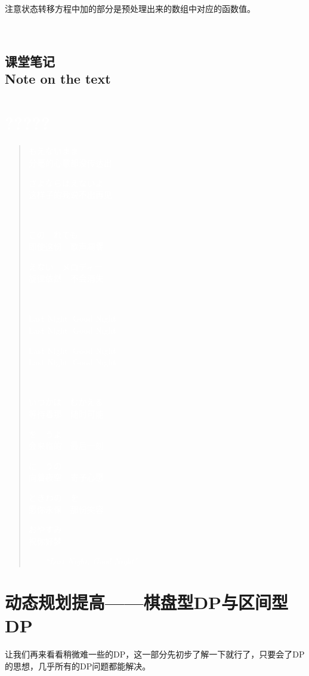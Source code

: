 \documentclass{article}
\theoremstyle{nonumberplain}
\newcommand{\note}{\ \par


	\subsection*{课堂笔记\\\tiny{Note on the text}}
	\newpage}
\begin{document}
注意状态转移方程中加的部分是预处理出来的数组中对应的函数值。

\note
\section*{\textcolor{white}{?????}}
\begin{quote}
	\textcolor{white}{もえないまま\\
		分毫的心意都没传达出}

	\textcolor{white}{さよならはえないよ\\
		这样子的我说不出再见}

	\ \par

	\textcolor{white}{この　れても\\
		即使这份　歌声凋零}

	\textcolor{white}{えない　メロディー\\
		旋律依然　不会消失}

	\ \par

	\textcolor{white}{Last Night, Good Night\\
		Last Night, Good Night}

	\textcolor{white}{Last Night, Good Night\\
		Last Night, Good Night}

	\ \par

	\textcolor{white}{いつかは　むかえる\\
		等待着那　随时可能}

	\textcolor{white}{を　うよ\\
		会来临的　最后一刻}

	\textcolor{white}{に　うの\\
		向着夜空　寄予心愿}

	\textcolor{white}{ときわの　を\\
		愿你永保　那份笑容}

	\textcolor{white}{おやすみ\\
		祝你好梦}
	\begin{flushright}\textcolor{white}{------}\em{\textcolor{white}{``Last Night, Good Night"}}\end{flushright}
\end{quote}

\newpage
\section{动态规划提高------棋盘型DP与区间型DP}
让我们再来看看稍微难一些的DP，这一部分先初步了解一下就行了，只要会了DP的思想，几乎所有的DP问题都能解决。
\end{document}
